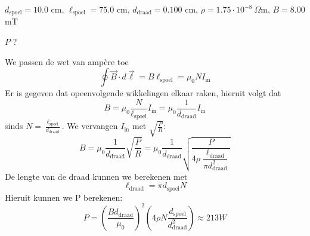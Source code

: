 \begin{description}[labelwidth=1.5cm, leftmargin=!]
    \item[Geg. :]   $d_{\text{spoel}} = 10.0$ cm, $\ell_{\text{spoel}} = 75.0$ cm, $d_{\text{draad}} = 0.100$ cm, $\rho = 1.75 \cdot 10^{-8} \ \Omega$m, $B = 8.00$ mT
    \item[Gevr. :]  $P$ ?
    \item[Opl. :]   
    
                    We passen de wet van ampère toe 
                    \begin{equation*}
                        \oint \Vec{B} \cdot d\Vec{\ell} = B\ell_{\text{spoel}} = \mu_0NI_{\text{in}}
                    \end{equation*}
                    Er is gegeven dat opeenvolgende wikkelingen elkaar raken, hieruit volgt dat 
                    \begin{equation*}
                        B = \mu_0\dfrac{N}{\ell_{\text{spoel}}}I_{\text{in}} = \mu_0\frac{1}{d_{\text{draad}}}I_{\text{in}} 
                    \end{equation*}
                    sinds $N = \tfrac{\ell_{\text{spoel}}}{d_{\text{draad}}}$. We vervangen $I_{\text{in}}$ met $\sqrt{\tfrac{P}{R}}$:
                    \begin{equation*}
                        B = \mu_0\frac{1}{d_{\text{draad}}}\sqrt{\dfrac{P}{R}} = \mu_0\frac{1}{d_{\text{draad}}}\sqrt{\dfrac{P}{4\rho\dfrac{\ell_{\text{draad}}}{\pi d_{\text{draad}}^2}}}
                    \end{equation*}
                    De lengte van de draad kunnen we berekenen met
                    \begin{equation*}
                        \ell_{\text{draad}} = \pi d_{\text{spoel}} N 
                    \end{equation*}
                    Hieruit kunnen we P berekenen: 
                    \begin{equation*}
                        P = \left(\dfrac{Bd_{\text{draad}}}{\mu_0}\right)^2\left(4\rho N \dfrac{d_{\text{spoel}}}{
                        d_{\text{draad}}^2}\right) \approx 213 W
                    \end{equation*}           
\end{description}

\vspace{1cm}